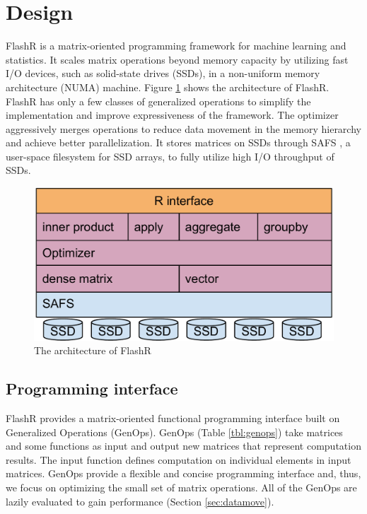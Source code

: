 \section{Design}

FlashR is a matrix-oriented programming framework for machine learning and
statistics. It scales matrix operations beyond memory capacity by utilizing
fast I/O devices, such as solid-state drives (SSDs), in a non-uniform memory
architecture (NUMA) machine. Figure \ref{fig:arch} shows the architecture of
FlashR. FlashR has only a few classes of generalized operations to simplify
the implementation and improve expressiveness of the framework. 
The optimizer aggressively merges operations to
reduce data movement in the memory hierarchy and achieve better parallelization.
It stores matrices on SSDs through SAFS \cite{safs},
a user-space filesystem for SSD arrays, to fully utilize high I/O
throughput of SSDs.

\begin{figure}
\centering
\includegraphics[scale=0.3]{FlashMatrix_figs/architecture.pdf}
\caption{The architecture of FlashR}
\label{fig:arch}
\end{figure}

\subsection{Programming interface}

FlashR provides a matrix-oriented functional programming interface built
on Generalized Operations (GenOps).  GenOps (Table \ref{tbl:genops}) take matrices and
some functions as input and output new matrices that represent computation results.
The input function defines computation on individual elements in input matrices.
GenOps provide a flexible and concise programming interface and, thus,
we focus on optimizing the small set of matrix operations. All of
the GenOps are lazily evaluated to gain performance (Section
\ref{sec:datamove}).

